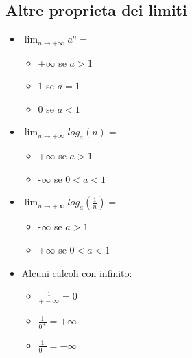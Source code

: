 \documentclass{article}
\begin{document}
\begin{flushleft}
\begin{flushleft}
                \subsection{Altre proprieta dei limiti}
                \begin{flushleft}
                    \begin{itemize}
                        \item $\lim_{n\to+\infty} a^n =$
                            \begin{itemize}
                             \item +$\infty$ se $a>1$
                             \item $1$ se $a=1$
                             \item $0$ se $a<1$
                            \end{itemize}
                        \item $\lim_{n\to+\infty} log_a(n)=$
                            \begin{itemize}
                             \item +$\infty$ se $a>1$
                             \item -$\infty$ se $0<a<1$
                            \end{itemize}
                        \item $\lim_{n\to+\infty} log_a(\frac{1}{n})=$
                            \begin{itemize}
                             \item -$\infty$ se $a>1$
                             \item +$\infty$ se $0<a<1$
                            \end{itemize}
                        \item Alcuni calcoli con infinito:
                            \begin{itemize}
                             \item $\frac{1}{+-\infty}=0$
                             \item $\frac{1}{0^+}=+\infty$
                             \item $\frac{1}{0^-}=-\infty$
                            \end{itemize}
                    \end{itemize}
                \end{flushleft}

\end{flushleft}
\end{flushleft}
\end{document}

